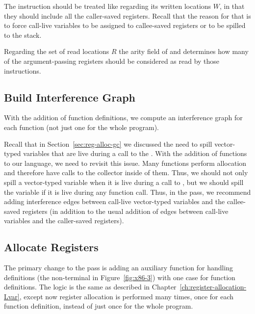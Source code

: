 \documentclass[7x10]{TimesAPriori_MIT}%
\begin{document}

The  instruction should be treated like
 regarding its written locations $W$, in that they should
include all the caller-saved registers. Recall that the reason for
that is to force call-live variables to be assigned to callee-saved
registers or to be spilled to the stack.

Regarding the set of read locations $R$ the arity field of
 and  determines how many of the
argument-passing registers should be considered as read by those
instructions.

\subsection{Build Interference Graph}
\label{sec:build-interference-r4}

With the addition of function definitions, we compute an interference
graph for each function (not just one for the whole program).

Recall that in Section~\ref{sec:reg-alloc-gc} we discussed the need to
spill vector-typed variables that are live during a call to the
.  With the addition of functions to our language, we
need to revisit this issue. Many functions perform allocation and
therefore have calls to the collector inside of them. Thus, we should
not only spill a vector-typed variable when it is live during a call
to , but we should spill the variable if it is live
during any function call. Thus, in the  pass,
we recommend adding interference edges between call-live vector-typed
variables and the callee-saved registers (in addition to the usual
addition of edges between call-live variables and the caller-saved
registers).


\subsection{Allocate Registers}

The primary change to the  pass is adding an
auxiliary function for handling definitions (the \Def{} non-terminal
in Figure~\ref{fig:x86-3}) with one case for function definitions. The
logic is the same as described in
Chapter~\ref{ch:register-allocation-Lvar}, except now register
allocation is performed many times, once for each function definition,
instead of just once for the whole program.
\end{document}
